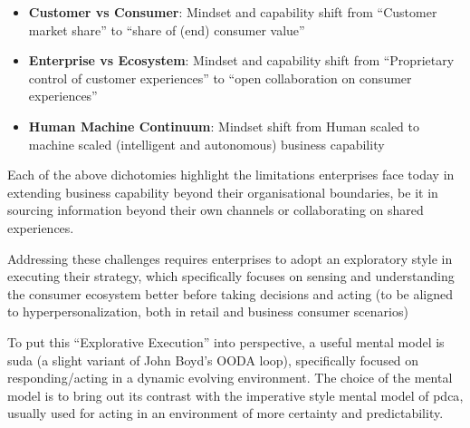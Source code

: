 \begin{itemize}
    \item \textbf{Customer vs Consumer}: Mindset and capability shift from ``Customer market share'' to
          ``share of (end) consumer value''
    \item \textbf{Enterprise vs Ecosystem}: Mindset and capability shift from
          “Proprietary control of customer experiences” to “open collaboration on consumer experiences”
    \item \textbf{Human Machine Continuum}: Mindset shift from Human scaled to machine scaled
          (intelligent and autonomous) business capability
\end{itemize}
Each of the above dichotomies highlight the limitations enterprises face today in extending business capability
beyond their organisational boundaries, be it in sourcing information beyond their own channels or collaborating
on shared experiences.

Addressing these challenges requires enterprises to adopt an exploratory style in executing their strategy,
which specifically focuses on sensing and understanding the consumer ecosystem better before taking decisions
and acting (to be aligned to hyperpersonalization, both in retail and business consumer scenarios)

To put this “Explorative Execution” into perspective, a useful mental model is \gls{suda}
(a slight variant of John Boyd’s OODA loop),
specifically focused on responding/acting in a dynamic evolving environment.
The choice of the mental model is to bring out its contrast with the imperative style mental model of \gls{pdca},
usually used for acting in an environment of more certainty and predictability.

